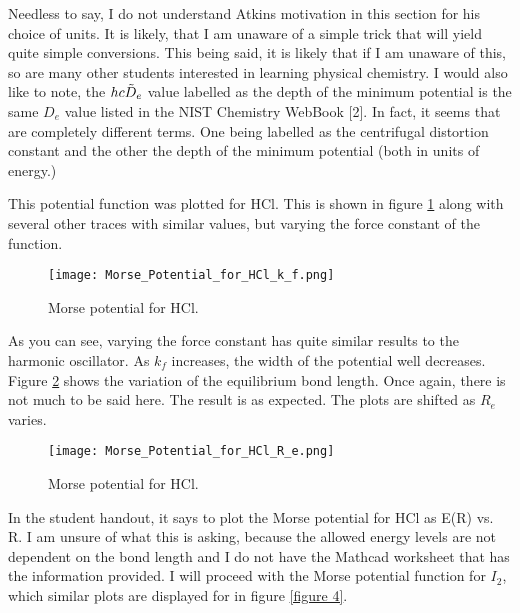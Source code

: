\documentclass[letterpaper,12pt]{article}
\begin{document}
\begin{tcolorbox}[breakable,title=Units, height fixed for=first and middle]
Needless to say, I do not understand Atkins motivation in this section for his choice of units. It is likely, that I am unaware of a simple trick that will yield quite simple conversions. This being said, it is likely that if I am unaware of this, so are many other students interested in learning physical chemistry. I would also like to note, the $hc\Tilde{D}_e$ value labelled as the depth of the minimum potential is  the same $D_e$ value listed in the NIST Chemistry WebBook [2]. In fact, it seems that are completely different terms. One being labelled as the centrifugal distortion constant and the other the depth of the minimum potential (both in units of energy.)
\end{tcolorbox}
This potential function was plotted for HCl. This is shown in figure \ref{figure 2} along with several other traces with similar values, but varying the force constant of the function.
\begin{figure}[!h]
\centering
\texttt{[image: Morse\_Potential\_for\_HCl\_k\_f.png]}
\caption{Morse potential for HCl.}
\label{figure 2}
\end{figure}\newline
As you can see, varying the force constant has quite similar results to the harmonic oscillator. As $k_f$ increases, the width of the potential well decreases. Figure \ref{figure 3} shows the variation of the equilibrium bond length. Once again, there is not much to be said here. The result is as expected. The plots are shifted as $R_e$ varies.
\begin{figure}[!h]
\centering
\texttt{[image: Morse\_Potential\_for\_HCl\_R\_e.png]}
\caption{Morse potential for HCl.}
\label{figure 3}
\end{figure}\newline
In the student handout, it says to plot the Morse potential for HCl as E(R) vs. R. I am unsure of what this is asking, because the allowed energy levels are not dependent on the bond length and I do not have the Mathcad worksheet that has the information provided. I will proceed with the Morse potential function for $I_2$, which similar plots are displayed for in figure \ref{figure 4}. 
\end{document}
